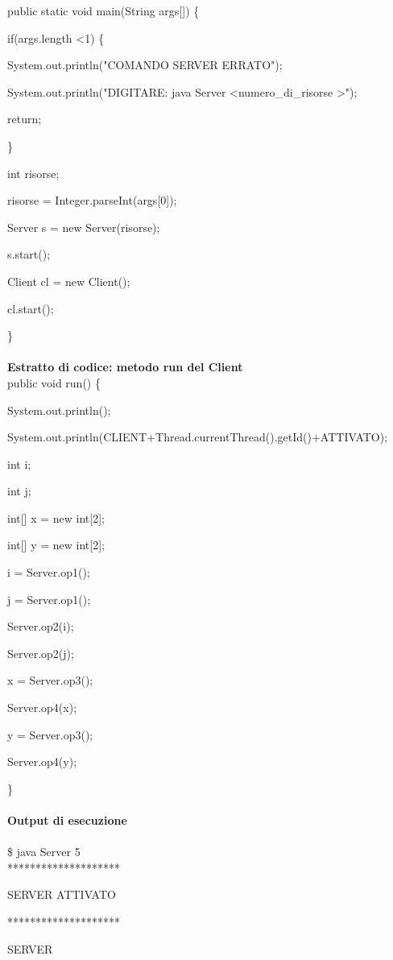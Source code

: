 \documentclass[10pt, a4paper]{article}
\begin{document}
public static void main(String args[]) \{

        if(args.length \textless 1) \{

            System.out.println("COMANDO SERVER ERRATO");

            System.out.println("DIGITARE: java Server \textless numero\_di\_risorse \textgreater");

            return;

        \}

        int risorse;

        risorse = Integer.parseInt(args[0]);

        Server s = new Server(risorse);

        s.start();

	Client cl = new Client();

	cl.start();

\}
\\\\
\textbf{Estratto di codice: metodo run del Client}
\\

public void run() \{

		System.out.println();

        	System.out.println(CLIENT+Thread.currentThread().getId()+ATTIVATO);

		int i;

		int j;
		
		int[] x = new int[2];

		int[] y = new int[2];

		i = Server.op1();

		j = Server.op1();

		Server.op2(i);

		Server.op2(j);

		x = Server.op3();

		Server.op4(x);

		y = Server.op3();

		Server.op4(y);

\}
\\\\
\textbf{Output di esecuzione}
\\\\
\$ java Server 5
\\

********************

SERVER ATTIVATO

********************

SERVER
\end{document}
